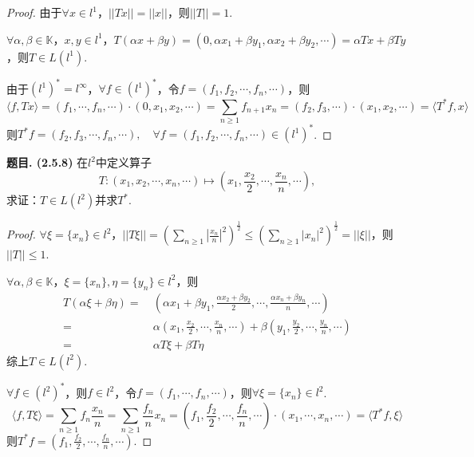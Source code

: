 \documentclass[12pt, a4paper, oneside]{ctexart}
\newcounter{problem}  %
\newenvironment{problem}[1][]{\stepcounter{problem}\par\noindent\textbf{题目\arabic{problem}. #1}}{\smallskip\par}
\let\leq=\leqslant %
\let\geq=\geqslant %
\def\K{\mathbb{K}}          %
\begin{document}
\begin{proof}
    由于$\forall x\in l^1$，$||Tx|| = ||x||$，则$||T|| = 1$.

    $\forall \alpha,\beta\in \K$，$x,y\in l^1$，$T(\alpha x+\beta y) = (0,\alpha x_1+\beta y_1,\alpha x_2+\beta y_2,\cdots) = \alpha Tx + \beta Ty$，则$T\in L(l^1)$.

    由于$(l^1)^* = l^{\infty}$，$\forall f\in (l^1)^*$，令$f = (f_1,f_2,\cdots, f_n,\cdots)$，则
    \begin{equation*}
        \langle f,Tx\rangle = (f_1,\cdots, f_n,\cdots)\cdot (0,x_1,x_2,\cdots) = \sum_{n\geq 1}f_{n+1}x_n = (f_2,f_3,\cdots)\cdot (x_1,x_2,\cdots) = \langle T^*f, x\rangle
    \end{equation*}
    则$T^*f = (f_2,f_3,\cdots, f_n,\cdots),\quad \forall f = (f_1,f_2,\cdots, f_n,\cdots)\in (l^1)^*$.
\end{proof}
\begin{problem}[(2.5.8)]
    在$l^2$中定义算子
    \begin{equation*}
        T:(x_1,x_2,\cdots, x_n,\cdots)\mapsto \left(x_1,\frac{x_2}{2},\cdots, \frac{x_n}{n},\cdots\right),
    \end{equation*}
    求证：$T\in L(l^2)$并求$T^*$.
\end{problem}
\begin{proof}
    $\forall \xi=\{x_n\}\in l^2$，$||T\xi|| = \left(\sum_{n\geq 1}\left|\frac{x_n}{n}\right|^2\right)^{\frac{1}{2}}\leq \left(\sum_{n\geq 1}|x_n|^2\right)^{\frac{1}{2}} = ||\xi||$，则$||T||\leq 1$.

    $\forall \alpha,\beta\in \K$，$\xi=\{x_n\},\eta=\{y_n\}\in l^2$，则
    \begin{align}
        T(\alpha\xi+\beta\eta) =&\ \left(\alpha x_1+\beta y_1,\frac{\alpha x_2+\beta y_2}{2},\cdots, \frac{\alpha x_n+\beta y_n}{n},\cdots\right)\\
        =&\ \alpha\left(x_1,\frac{x_2}{2},\cdots,\frac{x_n}{n},\cdots\right)+\beta\left(y_1,\frac{y_2}{2},\cdots,\frac{y_n}{n},\cdots\right)\\
        =&\ \alpha T\xi+\beta T\eta
    \end{align}
    综上$T\in L(l^2)$.

    $\forall f\in (l^2)^*$，则$f\in l^2$，令$f = (f_1,\cdots, f_n,\cdots)$，则$\forall \xi = \{x_n\}\in l^2$.
    \begin{equation*}
        \langle f,T\xi\rangle = \sum_{n\geq 1}f_n\frac{x_n}{n} = \sum_{n\geq 1}\frac{f_n}{n}x_n = \left(f_1,\frac{f_2}{2},\cdots,\frac{f_n}{n},\cdots\right)\cdot (x_1,\cdots, x_n,\cdots) = \langle T^*f, \xi\rangle
    \end{equation*}
    则$T^* f = \left(f_1,\frac{f_2}{2},\cdots, \frac{f_n}{n},\cdots\right)$.
\end{proof}
\end{document}
